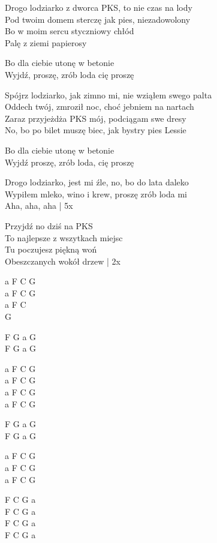 \begin{text}
    Drogo lodziarko z dworca PKS, to nie czas na lody\\
    Pod twoim domem sterczę jak pies, niezadowolony\\
    Bo w moim sercu styczniowy chłód\\
	Palę z ziemi papierosy 

    \vin Bo dla ciebie utonę w betonie\\
    \vin Wyjdź, proszę, zrób loda cię proszę  

    Spójrz lodziarko, jak zimno mi, nie wziąłem swego palta\\
    Oddech twój, zmroził noc, choć jebniem na nartach\\
    Zaraz przyjeżdża PKS mój, podciągam swe dresy\\
    No, bo po bilet muszę biec, jak bystry pies Lessie

    \vin Bo dla ciebie utonę w betonie\\
    \vin Wyjdź proszę, zrób loda, cię proszę

    Drogo lodziarko, jest mi źle, no, bo do lata daleko\\
    Wypiłem mleko, wino i krew, proszę zrób loda mi\\
    Aha, aha, aha | 5x

    Przyjdź no dziś na PKS\\ 
    To najlepsze z wszytkach miejsc\\
    Tu poczujesz piękną woń\\
    Obeszczanych wokół drzew | 2x
\end{text}
\begin{chord}
    a F C G\\
    a F C G\\ 
    a F C\\
    G 

    F G a G \\
    F G a G 

    a F C G\\
    a F C G\\
	a F C G\\ 
    a F C G 
	
    F G a G \\
    F G a G 

    a F C G\\
	a F C G\\
	a F C G
	
    F C G a\\ 
    F C G a\\ 
    F C G a\\
    F C G a
\end{chord}
